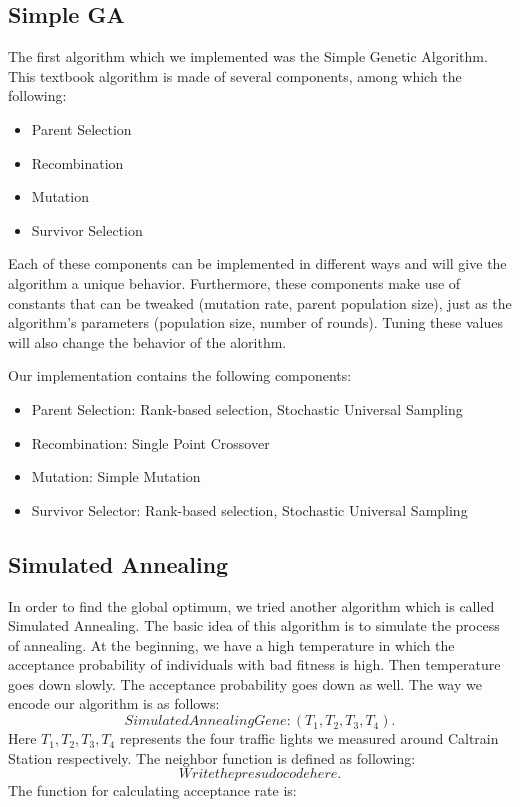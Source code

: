 \documentclass{article} %
\begin{document}
\subsection{Simple GA}
The first algorithm which we implemented was the Simple Genetic Algorithm. This textbook algorithm is made of several components, among which the following:
\begin{itemize}
 \item Parent Selection
 \item Recombination
 \item Mutation
 \item Survivor Selection
\end{itemize}
Each of these components can be implemented in different ways and will give the algorithm a unique behavior. Furthermore, these components make use of constants that can be tweaked (mutation rate, parent population size), just as the algorithm's parameters (population size, number of rounds). Tuning these values will also change the behavior of the alorithm.

Our implementation contains the following components:
\begin{itemize}
 \item Parent Selection: Rank-based selection, Stochastic Universal Sampling
 \item Recombination: Single Point Crossover
 \item Mutation: Simple Mutation
 \item Survivor Selector: Rank-based selection, Stochastic Universal Sampling
\end{itemize}



\subsection{Simulated Annealing}
In order to find the global optimum, we tried another algorithm which is called Simulated Annealing. The basic idea of this algorithm is to simulate the process of annealing. At the beginning, we have a high temperature in which the acceptance probability of individuals with bad fitness is high. Then temperature goes down slowly. The acceptance probability goes down as well. The way we encode our algorithm is as follows:
\begin{equation}
Simulated Annealing Gene:(T_1, T_2, T_3, T_4).
\end{equation}
Here $T_1, T_2, T_3, T_4$ represents the four traffic lights we measured around Caltrain Station respectively.
The neighbor function is defined as following:
\begin{equation}
Write the presudo code here.
\end{equation}
The function for calculating acceptance rate is:
\end{document}
